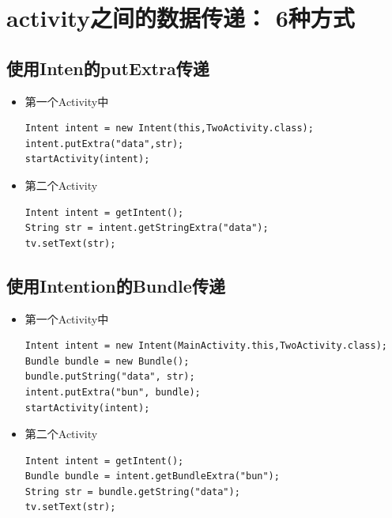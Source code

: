 \documentclass[9pt, b5paaper]{book}
\begin{document}
\section{activity之间的数据传递： 6种方式}
\label{sec-1-6}
\subsection{使用Inten的putExtra传递}
\label{sec-1-6-1}
\begin{itemize}
\item 第一个Activity中
\begin{verbatim}
Intent intent = new Intent(this,TwoActivity.class);
intent.putExtra("data",str);
startActivity(intent);
\end{verbatim}
\item 第二个Activity
\begin{verbatim}
Intent intent = getIntent();
String str = intent.getStringExtra("data");
tv.setText(str);
\end{verbatim}
\end{itemize}
\subsection{使用Intention的Bundle传递}
\label{sec-1-6-2}
\begin{itemize}
\item 第一个Activity中
\begin{verbatim}
Intent intent = new Intent(MainActivity.this,TwoActivity.class);
Bundle bundle = new Bundle();
bundle.putString("data", str);
intent.putExtra("bun", bundle);
startActivity(intent);
\end{verbatim}
\item 第二个Activity
\begin{verbatim}
Intent intent = getIntent();
Bundle bundle = intent.getBundleExtra("bun");
String str = bundle.getString("data");
tv.setText(str);
\end{verbatim}
\end{itemize}
\end{document}
